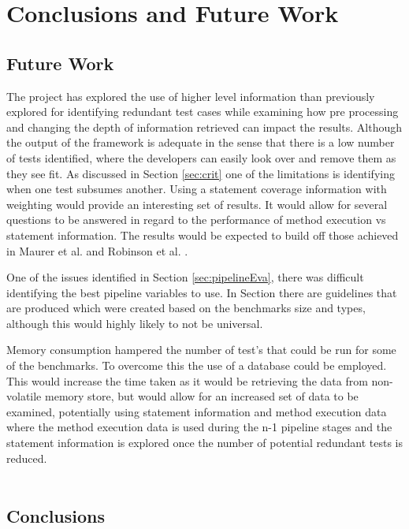 \chapter{Conclusions and Future Work}\label{C:future}

\section{Future Work}
The project has explored the use of higher level information than previously explored for identifying redundant test cases while examining how pre processing and changing the depth of information retrieved can impact the results. Although the output of the framework is adequate in the sense that there is a low number of tests identified, where the developers can easily look over and remove them as they see fit. As discussed in Section \ref{sec:crit} one of the limitations is identifying when one test subsumes another. Using a statement coverage information with weighting would provide an interesting set of results. It would allow for several questions to be answered in regard to the performance of method execution vs statement information. The results would be expected to build off those achieved in Maurer et al. \cite{li2008static}  and Robinson et al. \cite{koochakzadeh2009test}. 

One of the issues identified in Section \ref{sec:pipelineEva}, there was difficult identifying the best pipeline variables to use. In Section  there are guidelines that are produced which were created based on the benchmarks size and types, although this would highly likely to not be universal. 

Memory consumption hampered the number of test's that could be run for some of the benchmarks. To overcome this the use of a database could be employed. This would increase the time taken as it would be retrieving the data from non-volatile memory store, but would allow for an increased set of data to be examined, potentially using statement information and method execution data where the method execution data is used during the n-1 pipeline stages and the statement information is explored once the number of potential redundant tests is reduced. 
\\
\\


\section{Conclusions}

 \\
 \\
